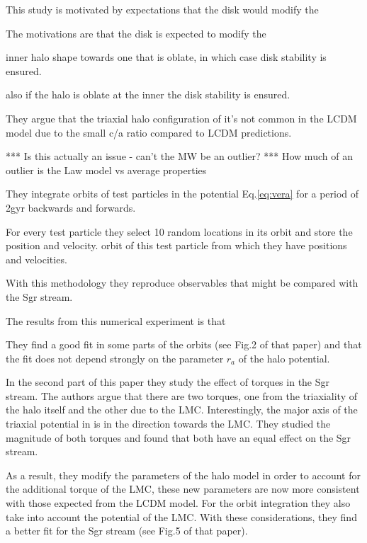 \documentclass[12pt]{article}
\begin{document}
This study is motivated by expectations that the disk would modify the 

The motivations are that the disk is expected
 to modify the

 inner halo shape towards one that is oblate, in which case disk stability 
is ensured.  

also if the
halo is oblate at the inner the disk stability is ensured. 

They
argue that the triaxial halo configuration of \citep{Law10} it's
not common in the LCDM model due to the small c/a ratio compared to
LCDM predictions.

*** Is this actually an issue - can’t the MW be an outlier?   
***  How much of an outlier is the Law model vs average properties


They integrate orbits of test particles in the potential Eq.\ref{eq:vera} for a period
of 2gyr backwards and forwards. 

For every test particle they select 10 random locations 
in its orbit and store the position and velocity. 
orbit of this test particle from which they have positions and velocities.

 With this methodology they reproduce observables that might be compared with 
the Sgr stream.

The results from this numerical experiment is that 

They find  a good fit in some
parts of the orbits (see Fig.2 of that paper) and that the fit does not depend
strongly on the parameter $r_a$ of the halo potential.

In the second part of this paper they study the effect of torques in the Sgr
stream. The authors argue that there are two torques, one from the triaxiality
of the halo itself and the other due to the LMC. Interestingly, the major
axis of the triaxial potential in \citep{Law10} is in the direction towards
 the LMC. They studied the magnitude of both torques and found that both
have an equal effect on the Sgr stream.

As a result, they modify the parameters of the halo model in order to account
for the additional torque of the LMC, these new parameters are now more consistent
 with those expected from the LCDM model. For the orbit integration they also take
into account the potential of the LMC. With these considerations, they find a better fit for  the Sgr
stream (see Fig.5 of that paper).
\end{document}
